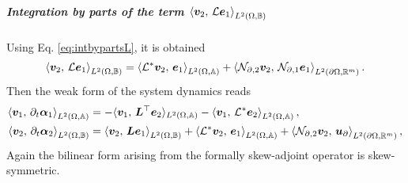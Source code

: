 \subparagraph{Integration by parts of the term $\inner[L^2(\Omega, \mathbb{B})]{\bm{v}_2}{\mathcal{L}\bm{e}_1}$}
Using Eq. \eqref{eq:intbypartsL}, it is obtained 
\begin{equation}
\inner[L^2(\Omega, \mathbb{B})]{\bm{v}_2}{\mathcal{L}\bm{e}_1} = \inner[L^2(\Omega, \mathbb{A})]{\mathcal{L}^*\bm{v}_2}{\bm{e}_1} + \inner[L^2(\partial \Omega, \mathbb{R}^m)]{\mathcal{N}_{\partial, 2} \bm{v}_2}{\mathcal{N}_{\partial, 1} \bm{e}_1}.
\end{equation}
Then the weak form of the system dynamics  reads 
\begin{equation}\label{eq:weak_dyn_intJ2}
\begin{aligned}
\inner[L^2(\Omega, \mathbb{A})]{\bm{v}_1}{\partial_t \bm{\alpha}_1} &=   -  \langle{\bm{v}_1}, \,{\bm{L}^\top \bm{e}_2}\rangle_{L^2(\Omega, \mathbb{A})}  -\inner[L^2(\Omega, \mathbb{A})]{\bm{v}_1}{\mathcal{L}^*\bm{e}_2}, \\
\inner[L^2(\Omega, \mathbb{B})]{\bm{v}_2}{\partial_t \bm{\alpha}_2} &=   \inner[L^2(\Omega, \mathbb{B})]{\bm{v}_2}{\bm{L}\bm{e}_1}  + \inner[L^2(\Omega, \mathbb{A})]{\mathcal{L}^*\bm{v}_2}{\bm{e}_1} + \inner[L^2(\partial \Omega, \mathbb{R}^m)]{\mathcal{N}_{\partial, 2} \bm{v}_2}{\bm{u}_{\partial}}, \\
\end{aligned}
\end{equation}
Again the bilinear form arising from the formally skew-adjoint operator is skew-symmetric.
